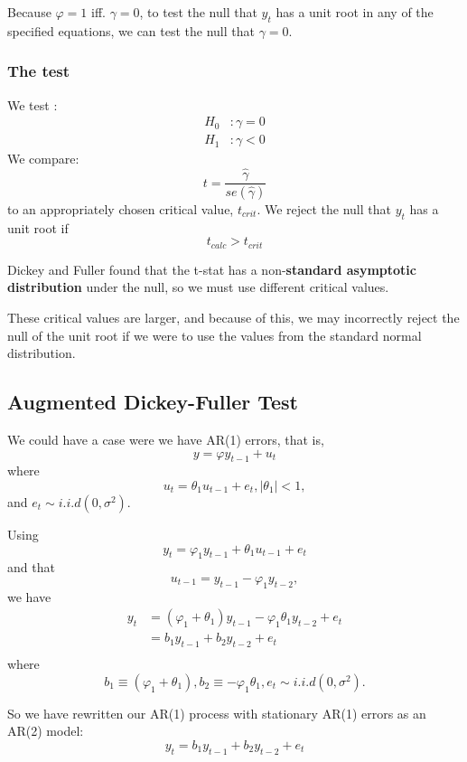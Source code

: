 \documentclass[11pt]{article}
\begin{document}
Because $\varphi = 1$ iff. $\gamma =0$, to test the null that $y_t$ has a unit root in any of the specified equations, we can test the null that $\gamma=0$.

\begin{shaded}
\subsubsection{The test}

We test :
\begin{align*}
H_0&: \gamma=0 \\
H_1&: \gamma<0
\end{align*}
We compare:
\[t = \dfrac{\hat{\gamma}}{se(\hat{\gamma})}\]
to an appropriately chosen critical value, $t_{crit}$. We reject the null that $y_t$ has a unit root if
\[t_{calc}>t_{crit}\]


\end{shaded}

Dickey and Fuller found that the t-stat has a non-\textbf{standard asymptotic distribution} under the null, so we must use different critical values.

These critical values are larger, and because of this, we may incorrectly reject the null of the unit root if we were to use the values from the standard normal distribution.

\subsection{Augmented Dickey-Fuller Test}

We could have a case were we have AR(1) errors, that is,
\[y = \varphi y_{t-1} + u_t\]
where 
\[u_t = \theta_1 u_{t-1} + e_t, |\theta_1|<1,\]
and $e_t \sim i.i.d(0,\sigma^2)$.

Using
\[y_t=\varphi_1 y_{t-1}+\theta_1 u_{t-1}+e_t\]
and that
\[u_{t-1}=y_{t-1}-\varphi_1 y_{t-2},\]
we have
\begin{align*}
    y_t&=\left(\varphi_1+\theta_1\right) y_{t-1}-\varphi_1 \theta_1 y_{t-2}+e_t \\
&=b_1 y_{t-1}+b_2 y_{t-2}+e_t \\
\end{align*}
where
\[b_1 \equiv\left(\varphi_1+\theta_1\right), b_2 \equiv-\varphi_1 \theta_1, e_t \sim i . i . d\left(0, \sigma^2\right).\]

So we have rewritten our AR(1) process with stationary AR(1) errors as an AR(2) model:
\[y_t =b_1 y_{t-1}+b_2 y_{t-2}+e_t\]
\end{document}
